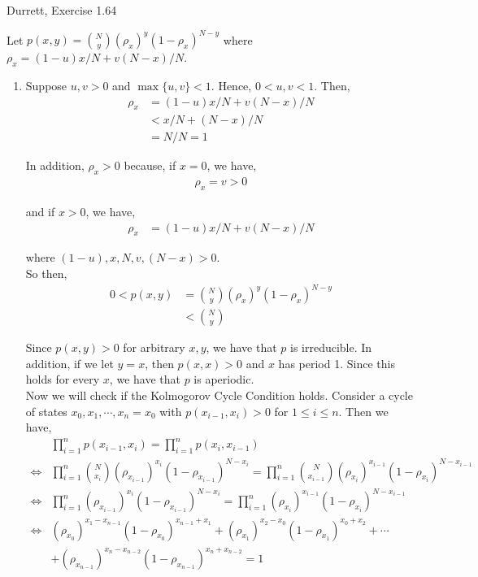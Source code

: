 \documentclass[12pt]{article}
\newenvironment{problem}[2][Problem]{\begin{trivlist}
\item[\hskip \labelsep {\bfseries #1}\hskip \labelsep {\bfseries #2.}]}{\end{trivlist}}
\begin{document}
\newpage
\begin{problem}{3}
Durrett, Exercise 1.64
\end{problem}

Let $p(x, y) = {N \choose y} (\rho_x)^y(1-\rho_x)^{N-y}$ where $\rho_x = (1 - u)x/N + v(N-x)/N$.
\begin{enumerate}[label=(\alph*)]

\item Suppose $u, v > 0$ and $\max \{u, v\} < 1$. Hence, $0 < u, v < 1$. Then,
\begin{align*}
\rho_x &= (1 - u)x/N + v(N-x)/N\\
&< x/N + (N-x)/N\\
&= N/N = 1
\end{align*}

In addition, $\rho_x > 0$ because, if $x = 0$, we have,
\begin{align*}
\rho_x = v > 0
\end{align*}

and if $x > 0$, we have,
\begin{align*}
\rho_x &=(1 - u) x/N + v(N-x)/N
\end{align*}

where $(1 - u), x, N, v, (N - x) > 0$.\\


So then,
\begin{align*}
0 < p(x, y) &= {N \choose y} (\rho_x)^y(1-\rho_x)^{N-y}\\
&< {N \choose y}
\end{align*}

Since $p(x, y) > 0$ for arbitrary $x, y$, we have that $p$ is irreducible. In addition, if we let $y = x$, then $p(x, x) > 0$ and $x$ has period 1. Since this holds for every $x$, we have that $p$ is aperiodic.\\

Now we will check if the Kolmogorov Cycle Condition holds. Consider a cycle of states $x_0, x_1, \cdots, x_n = x_0$ with $p(x_{i-1}, x_i) > 0$ for $1 \leq i \leq n$. Then we have,
\begin{align*}
&\prod_{i=1}^n p(x_{i-1}, x_i) = \prod_{i=1}^n p(x_i, x_{i-1})\\
\iff &\prod_{i=1}^n {N \choose x_i} (\rho_{x_{i-1}})^{x_i}(1-\rho_{x_{i-1}})^{N-x_i} = \prod_{i=1}^n {N \choose x_{i-1}} (\rho_{x_{i}})^{x_{i-1}}(1-\rho_{x_{i}})^{N-x_{i-1}}\\
\iff &\prod_{i=1}^n (\rho_{x_{i-1}})^{x_i}(1-\rho_{x_{i-1}})^{N-x_i} = \prod_{i=1}^n (\rho_{x_{i}})^{x_{i-1}}(1-\rho_{x_{i}})^{N-x_{i-1}}\\
\iff &(\rho_{x_0})^{x_1 - x_{n-1}}(1 - \rho_{x_0})^{x_{n-1} + x_1} + (\rho_{x_1})^{x_2 - x_{0}}(1 - \rho_{x_1})^{x_{0} + x_2} + \cdots\\
&+ (\rho_{x_{n-1}})^{x_n - x_{n-2}}(1 - \rho_{x_{n-1}})^{x_{n} + x_{n-2}} = 1
\end{align*}


\end{enumerate}
\end{document}
